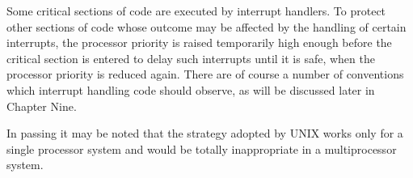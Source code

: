 Some critical sections of code are executed by interrupt
handlers. To protect other sections of code whose outcome may
be affected by the handling of
certain interrupts, the processor
priority is raised temporarily high
enough before the critical section is
entered to delay such interrupts until
it is safe, when the processor priority
is reduced again. There are of course
a number of conventions which interrupt
handling code should observe, as will
be discussed later in Chapter Nine.


In passing it may be noted that the
strategy adopted by UNIX works only for
a single processor system and would be
totally inappropriate in a multiprocessor system.
